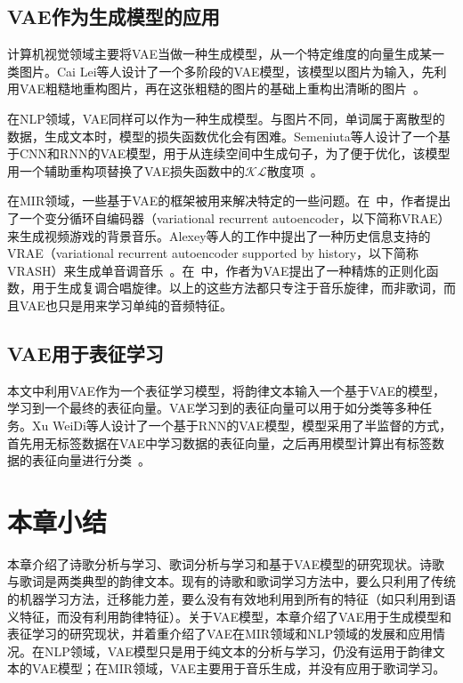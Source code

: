 \subsection{VAE作为生成模型的应用}
计算机视觉领域主要将VAE当做一种生成模型，从一个特定维度的向量生成某一类图片。Cai Lei等人设计了一个多阶段的VAE模型，该模型以图片为输入，先利用VAE粗糙地重构图片，再在这张粗糙的图片的基础上重构出清晰的图片~\autocite{cai2017multi}。\par

在NLP领域，VAE同样可以作为一种生成模型。与图片不同，单词属于离散型的数据，生成文本时，模型的损失函数优化会有困难。Semeniuta等人设计了一个基于CNN和RNN的VAE模型，用于从连续空间中生成句子，为了便于优化，该模型用一个辅助重构项替换了VAE损失函数中的$\mathcal{KL}$散度项~\autocite{semeniuta2017hybrid}。\par

在MIR领域，一些基于VAE的框架被用来解决特定的一些问题。在~\autocite{fabius2014variational}中，作者提出了一个变分循环自编码器（variational recurrent autoencoder，以下简称VRAE）来生成视频游戏的背景音乐。Alexey等人的工作中提出了一种历史信息支持的VRAE（variational recurrent autoencoder supported by history，以下简称VRASH）来生成单音调音乐~\autocite{alexey2017music}。在~\autocite{hadjeres2017glsr}中，作者为VAE提出了一种精炼的正则化函数，用于生成复调合唱旋律。以上的这些方法都只专注于音乐旋律，而非歌词，而且VAE也只是用来学习单纯的音频特征。\par

\subsection{VAE用于表征学习}

本文中利用VAE作为一个表征学习模型，将韵律文本输入一个基于VAE的模型，学习到一个最终的表征向量。VAE学习到的表征向量可以用于如分类等多种任务。Xu WeiDi等人设计了一个基于RNN的VAE模型，模型采用了半监督的方式，首先用无标签数据在VAE中学习数据的表征向量，之后再用模型计算出有标签数据的表征向量进行分类~\autocite{xu2017variational}。\par

\section{本章小结}
本章介绍了诗歌分析与学习、歌词分析与学习和基于VAE模型的研究现状。诗歌与歌词是两类典型的韵律文本。现有的诗歌和歌词学习方法中，要么只利用了传统的机器学习方法，迁移能力差，要么没有有效地利用到所有的特征（如只利用到语义特征，而没有利用韵律特征）。关于VAE模型，本章介绍了VAE用于生成模型和表征学习的研究现状，并着重介绍了VAE在MIR领域和NLP领域的发展和应用情况。在NLP领域，VAE模型只是用于纯文本的分析与学习，仍没有运用于韵律文本的VAE模型；在MIR领域，VAE主要用于音乐生成，并没有应用于歌词学习。\par

